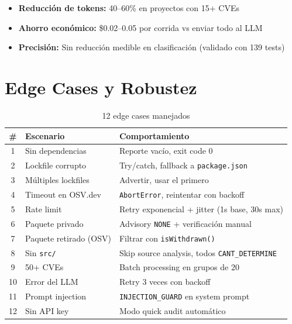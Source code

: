 \documentclass[11pt,a4paper]{article}
\begin{document}
\begin{itemize}
  \item \textbf{Reducción de tokens:} 40--60\% en proyectos con 15+ CVEs
  \item \textbf{Ahorro económico:} \$0.02--0.05 por corrida vs enviar todo al LLM
  \item \textbf{Precisión:} Sin reducción medible en clasificación (validado con 139 tests)
\end{itemize}

\section{Edge Cases y Robustez}

\begin{table}[H]
  \centering
  \caption{12 edge cases manejados}
  \begin{tabularx}{\textwidth}{c l X}
    \toprule
    \# & \textbf{Escenario} & \textbf{Comportamiento} \\
    \midrule
    1 & Sin dependencias & Reporte vacío, exit code 0 \\
    2 & Lockfile corrupto & Try/catch, fallback a \texttt{package.json} \\
    3 & Múltiples lockfiles & Advertir, usar el primero \\
    4 & Timeout en OSV.dev & \texttt{AbortError}, reintentar con backoff \\
    5 & Rate limit & Retry exponencial + jitter (1s base, 30s max) \\
    6 & Paquete privado & Advisory \texttt{NONE} + verificación manual \\
    7 & Paquete retirado (OSV) & Filtrar con \texttt{isWithdrawn()} \\
    8 & Sin \texttt{src/} & Skip source analysis, todos \texttt{CANT\_DETERMINE} \\
    9 & 50+ CVEs & Batch processing en grupos de 20 \\
    10 & Error del LLM & Retry 3 veces con backoff \\
    11 & Prompt injection & \texttt{INJECTION\_GUARD} en system prompt \\
    12 & Sin API key & Modo quick audit automático \\
    \bottomrule
  \end{tabularx}
\end{table}

\end{document}
